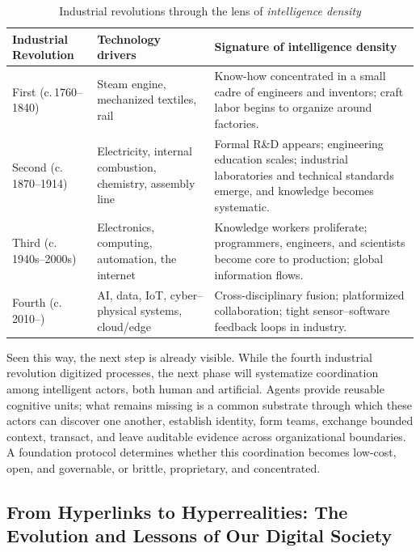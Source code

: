 \documentclass{foundationpaper}
\begin{document}
\begin{table}[ht]
\centering
\caption{Industrial revolutions through the lens of \emph{intelligence density}}
\label{tab:intel-density}
\footnotesize
\begin{tabular}{@{}p{} p{} p{}@{}}
\toprule
\textbf{Industrial Revolution} & \textbf{Technology drivers} & \textbf{Signature of intelligence density}\\
\midrule
First (c.\,1760--1840) & Steam engine, mechanized textiles, rail & Know-how concentrated in a small cadre of engineers and inventors; craft labor begins to organize around factories. \\
Second (c.\,1870--1914) & Electricity, internal combustion, chemistry, assembly line & Formal R\&D appears; engineering education scales; industrial laboratories and technical standards emerge, and knowledge becomes systematic.\\
Third (c.\,1940s--2000s) & Electronics, computing, automation, the internet & Knowledge workers proliferate; programmers, engineers, and scientists become core to production; global information flows. \\
Fourth (c.\,2010--) & AI, data, IoT, cyber--physical systems, cloud/edge & Cross-disciplinary fusion; platformized collaboration; tight sensor--software feedback loops in industry. \\
\bottomrule
\end{tabular}
\end{table}

Seen this way, the next step is already visible. While the fourth industrial revolution digitized processes, the next phase will systematize coordination among intelligent actors, both human and artificial. Agents provide reusable cognitive units; what remains missing is a common substrate through which these actors can discover one another, establish identity, form teams, exchange bounded context, transact, and leave auditable evidence across organizational boundaries. A foundation protocol determines whether this coordination becomes low-cost, open, and governable, or brittle, proprietary, and concentrated.



\subsection{From Hyperlinks to Hyperrealities: The Evolution and Lessons of Our Digital Society}
\label{subsec:web-evolve}
\end{document}
